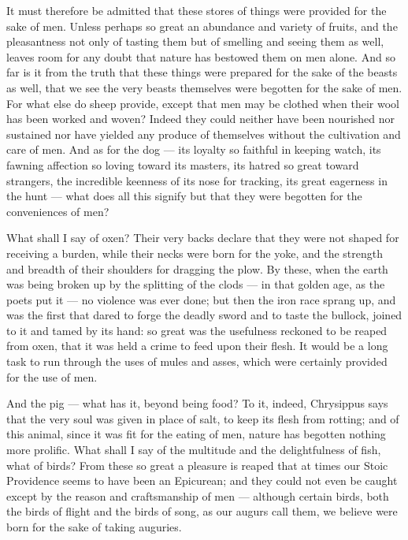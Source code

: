  It must therefore be admitted that these stores of things were provided for the sake of men. Unless perhaps so great an abundance and variety of fruits, and the pleasantness not only of tasting them but of smelling and seeing them as well, leaves room for any doubt that nature has bestowed them on men alone. And so far is it from the truth that these things were prepared for the sake of the beasts as well, that we see the very beasts themselves were begotten for the sake of men. For what else do sheep provide, except that men may be clothed when their wool has been worked and woven? Indeed they could neither have been nourished nor sustained nor have yielded any produce of themselves without the cultivation and care of men. And as for the dog — its loyalty so faithful in keeping watch, its fawning affection so loving toward its masters, its hatred so great toward strangers, the incredible keenness of its nose for tracking, its great eagerness in the hunt — what does all this signify but that they were begotten for the conveniences of men?

 What shall I say of oxen? Their very backs declare that they were not shaped for receiving a burden, while their necks were born for the yoke, and the strength and breadth of their shoulders for dragging the plow. By these, when the earth was being broken up by the splitting of the clods — in that golden age, as the poets put it — no violence was ever done; but then the iron race sprang up, and was the first that dared to forge the deadly sword and to taste the bullock, joined to it and tamed by its hand: so great was the usefulness reckoned to be reaped from oxen, that it was held a crime to feed upon their flesh. It would be a long task to run through the uses of mules and asses, which were certainly provided for the use of men.

 And the pig — what has it, beyond being food? To it, indeed, Chrysippus says that the very soul was given in place of salt, to keep its flesh from rotting; and of this animal, since it was fit for the eating of men, nature has begotten nothing more prolific. What shall I say of the multitude and the delightfulness of fish, what of birds? From these so great a pleasure is reaped that at times our Stoic Providence seems to have been an Epicurean; and they could not even be caught except by the reason and craftsmanship of men — although certain birds, both the birds of flight and the birds of song, as our augurs call them, we believe were born for the sake of taking auguries.

